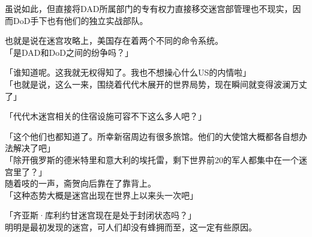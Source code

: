虽说如此，但直接将DAD所属部门的专有权力直接移交迷宫部管理也不现实，因而DoD手下也有他们的独立实战部队。

也就是说在迷宫攻略上，美国存在着两个不同的命令系统。\\

「是DAD和DoD之间的纷争吗？」

「谁知道呢。这我就无权得知了。我也不想操心什么US的内情啦」\\

「也就是说，这么一来，围绕着代代木展开的世界局势，现在瞬间就变得波澜万丈了」

「代代木迷宫相关的住宿设施可容不下这么多人吧？」

「这个他们也都知道了。所幸新宿周边有很多旅馆。他们的大使馆大概都各自想办法解决了吧」\\

「除开俄罗斯的德米特里和意大利的埃托雷，剩下世界前20的军人都集中在一个迷宫里了？」\\

随着吱的一声，斋贺向后靠在了靠背上。\\

「这种态势大概是迷宫出现在世界上以来头一次吧」

「齐亚斯·库利约甘迷宫现在是处于封闭状态吗？」\\

明明是最初发现的迷宫，可人们却没有蜂拥而至，这一定有些原因。\\

